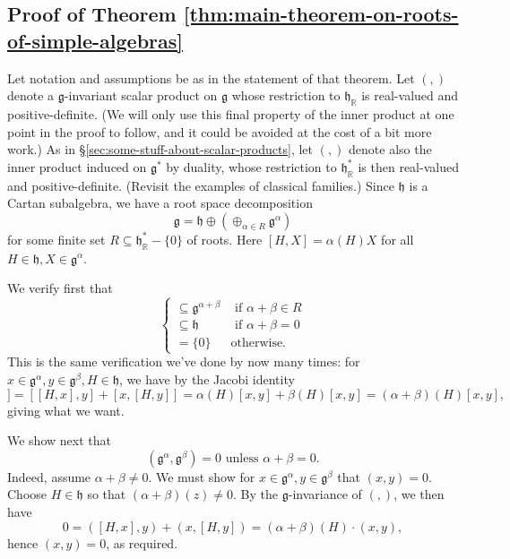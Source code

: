 \documentclass[reqno]{amsart} 
\begin{document}
\subsection{Proof of Theorem \ref{thm:main-theorem-on-roots-of-simple-algebras}}
\label{sec:orgfd608b2}
Let notation and assumptions be as in the statement of that theorem.  Let $(,)$ denote a $\mathfrak{g}$-invariant scalar product on $\mathfrak{g}$ whose restriction to $\mathfrak{h}_\mathbb{R}$ is real-valued and positive-definite.  (We will only use this final property of the inner product at one point in the proof to follow, and it could be avoided at the cost of a bit more work.)  As in \S\ref{sec:some-stuff-about-scalar-products}, let $(,)$ denote also the inner product induced on $\mathfrak{g}^*$ by duality, whose restriction to $\mathfrak{h}_\mathbb{R}^*$ is then real-valued and positive-definite.  (Revisit the examples of classical families.)  Since $\mathfrak{h}$ is a Cartan subalgebra, we have a root space decomposition
\begin{equation*}
  \mathfrak{g} = \mathfrak{h} \oplus (\oplus_{\alpha \in R} \mathfrak{g}^\alpha)
\end{equation*}
for some finite set $R \subseteq \mathfrak{h}_\mathbb{R}^* - \{0\}$ of roots.  Here $[H,X] = \alpha(H) X$ for all $H \in \mathfrak{h}, X \in \mathfrak{g}^\alpha$.

We verify first that
\begin{equation}
 [\mathfrak{g}^\alpha, \mathfrak{g}^\beta]
  \begin{cases}
    \subseteq \mathfrak{g}^{\alpha+\beta} & \text{ if } \alpha + \beta \in R \\
    \subseteq \mathfrak{h} & \text{ if } \alpha + \beta =0 \\
    = \{0\} & \text{otherwise.}
  \end{cases}
\end{equation}
This is the same verification we've done by now many times: for $x \in \mathfrak{g}^\alpha, y \in \mathfrak{g}^\beta, H \in \mathfrak{h}$, we have by the Jacobi identity
\begin{equation*}
 [H,[x,y]]
  = [[H, x],y] +[x,[H, y]] = \alpha(H) [x,y] + \beta(H) [x,y] = (\alpha + \beta)(H) [x,y],
\end{equation*}
giving what we want.

We show next that
\begin{equation}
  (\mathfrak{g}^\alpha, \mathfrak{g}^\beta) = 0 \text{ unless } \alpha + \beta = 0.
\end{equation}
Indeed, assume $\alpha + \beta \neq 0$.  We must show for $x \in \mathfrak{g}^\alpha, y \in \mathfrak{g}^\beta$ that $(x,y) = 0$.  Choose $H \in \mathfrak{h}$ so that $(\alpha + \beta)(z) \neq 0$.  By the $\mathfrak{g}$-invariance of $(,)$, we then have
\begin{equation*}
  0 = ([H,x],y) + (x,[H,y]) = (\alpha + \beta)(H) \cdot (x,y),
\end{equation*}
hence $(x,y) = 0$, as required.
\end{document}
